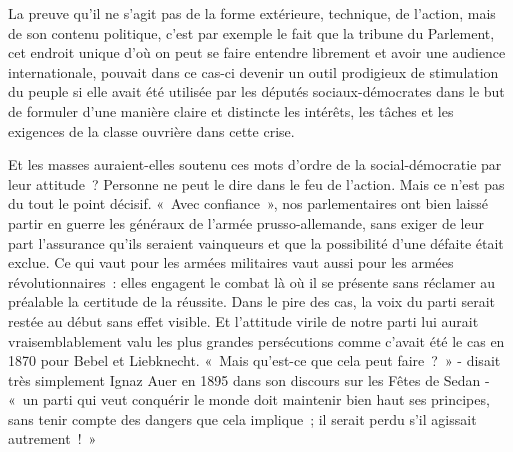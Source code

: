 \documentclass[french,twoside]{book} %
\begin{document}
\noindent La preuve qu’il ne s’agit pas de la forme extérieure, technique, de l’action, mais de son contenu politique, c’est par exemple le fait que la tribune du Parlement, cet endroit unique d’où on peut se faire entendre librement et avoir une audience internationale, pouvait dans ce cas-ci devenir un outil prodigieux de stimulation du peuple si elle avait été utilisée par les députés sociaux-démocrates dans le but de formuler d’une manière claire et distincte les intérêts, les tâches et les exigences de la classe ouvrière dans cette crise.\par
Et les masses auraient-elles soutenu ces mots d’ordre de la social-démocratie par leur attitude ? Personne ne peut le dire dans le feu de l’action. Mais ce n’est pas du tout le point décisif. « Avec confiance », nos parlementaires ont bien laissé partir en guerre les généraux de l’armée prusso-allemande, sans exiger de leur part l’assurance qu’ils seraient vainqueurs et que la possibilité d’une défaite était exclue. Ce qui vaut pour les armées militaires vaut aussi pour les armées révolutionnaires : elles engagent le combat là où il se présente sans réclamer au préalable la certitude de la réussite. Dans le pire des cas, la voix du parti serait restée au début sans effet visible. Et l’attitude virile de notre parti lui aurait vraisemblablement valu les plus grandes persécutions comme c’avait été le cas en 1870 pour Bebel et Liebknecht. « Mais qu’est-ce que cela peut faire ? » - disait très simplement Ignaz Auer en 1895 dans son discours sur les Fêtes de Sedan - « un parti qui veut conquérir le monde doit maintenir bien haut ses principes, sans tenir compte des dangers que cela implique ; il serait perdu s’il agissait autrement ! »\par
\end{document}
